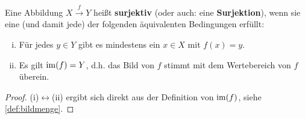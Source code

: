 \begin{defin} \label{def:surjektiv} 
    Eine Abbildung $X \xrightarrow{f} Y$ heißt \textbf{surjektiv} (oder auch: eine \textbf{Surjektion}), wenn sie eine (und damit jede) der folgenden äquivalenten Bedingungen erfüllt:
    \begin{enumerate}[(i)]
        \item Für jedes $y\in Y$ gibt es mindestens ein $x\in X$ mit $f(x)=y$.
        \item Es gilt $\operatorname{im}(f) = Y$, d.h. das Bild von $f$ stimmt mit dem Wertebereich von $f$ überein.
    \end{enumerate}
\end{defin}
\begin{proof}
    (i)$\leftrightarrow$(ii) ergibt sich direkt aus der Definition von $\operatorname{im}(f)$, siehe \cref{def:bildmenge}.
\end{proof}


